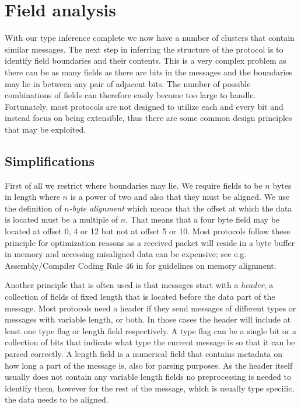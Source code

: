 \documentclass[a4paper]{report}
\begin{document}
\section{Field analysis}
\label{sec:fieldanalysis}
With our type inference complete we now have a number of clusters that contain
similar messages. The next step in inferring the structure of the protocol is
to identify field boundaries and their contents. This is a very complex
problem as there can be as many fields as there are bits in the messages and
the boundaries may lie in between any pair of adjacent bits. The number of
possible combinations of fields can therefore easily become too large to
handle. Fortunately, most protocols are not designed to utilize each and every
bit and instead focus on being extensible, thus there are some common design
principles that may be exploited.

\subsection{Simplifications}
\label{sec:simplifications}
First of all we restrict where boundaries may lie. We require fields to be $n$
bytes in length where $n$ is a power of two and also that they must be aligned.
We use the definition of \emph{$n$-byte alignment} which means that the offset
at which the data is located must be a multiple of $n$. That means that a four
byte field may be located at offset 0, 4 or 12 but not at offset 5 or 10. Most
protocols follow these principle for optimization reasons as a received packet
will reside in a byte buffer in memory and accessing misaligned data can be
expensive; see e.g. Assembly/Compiler Coding Rule 46 in 
for guidelines on memory alignment.

Another principle that is often used is that messages start with a
\emph{header}, a collection of fields of fixed length that is located before
the data part of the message. Most protocols need a header if they send
messages of different types or messages with variable length, or both. In those
cases the header will include at least one type flag or length field
respectively. A type flag can be a single bit or a collection of bits that
indicate what type the current message is so that it can be parsed correctly. A
length field is a numerical field that contains metadata on how long a part of
the message is, also for parsing purposes. As the header itself usually does
not contain any variable length fields no preprocessing is needed to identify
them, however for the rest of the message, which is usually type specific, the
data needs to be aligned.
\end{document}
